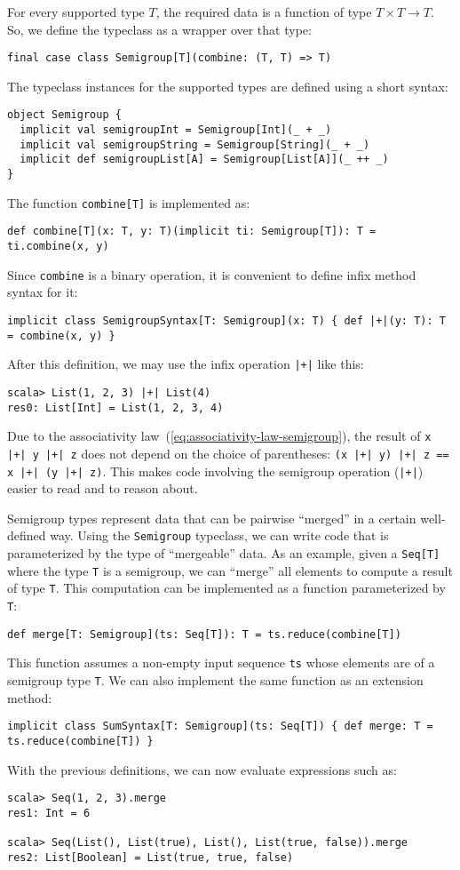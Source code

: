 For every supported type $T$, the required data is a function of
type $T\times T\rightarrow T$. So, we define the typeclass as a wrapper
over that type:
\begin{lstlisting}
final case class Semigroup[T](combine: (T, T) => T)
\end{lstlisting}
The typeclass instances for the supported types are defined using
a short syntax:
\begin{lstlisting}
object Semigroup {
  implicit val semigroupInt = Semigroup[Int](_ + _)
  implicit val semigroupString = Semigroup[String](_ + _)
  implicit def semigroupList[A] = Semigroup[List[A]](_ ++ _)
}
\end{lstlisting}
The function \lstinline!combine[T]! is implemented as:
\begin{lstlisting}
def combine[T](x: T, y: T)(implicit ti: Semigroup[T]): T = ti.combine(x, y)
\end{lstlisting}
Since \lstinline!combine! is a binary operation, it is convenient
to define infix method syntax for it:
\begin{lstlisting}
implicit class SemigroupSyntax[T: Semigroup](x: T) { def |+|(y: T): T = combine(x, y) }
\end{lstlisting}
After this definition, we may use the infix operation \lstinline!|+|!
like this:
\begin{lstlisting}
scala> List(1, 2, 3) |+| List(4)
res0: List[Int] = List(1, 2, 3, 4)
\end{lstlisting}
Due to the associativity law~(\ref{eq:associativity-law-semigroup}),
the result of \lstinline!x |+| y |+| z! does not depend on the choice
of parentheses: \lstinline!(x |+| y) |+| z == x |+| (y |+| z)!. This
makes code involving the semigroup operation (\lstinline!|+|!) easier
to read and to reason about.

Semigroup types represent data that can be pairwise \textsf{``}merged\textsf{''} in
a certain well-defined way. Using the \lstinline!Semigroup! typeclass,
we can write code that is parameterized by the type of \textsf{``}mergeable\textsf{''}
data. As an example, given a \lstinline!Seq[T]! where the type \lstinline!T!
is a semigroup, we can \textsf{``}merge\textsf{''} all elements to compute a result
of type \lstinline!T!. This computation can be implemented as a function
parameterized by \lstinline!T!:
\begin{lstlisting}
def merge[T: Semigroup](ts: Seq[T]): T = ts.reduce(combine[T])
\end{lstlisting}
This function assumes a non-empty input sequence \lstinline!ts! whose
elements are of a semigroup type \lstinline!T!. We can also implement
the same function as an extension method:
\begin{lstlisting}
implicit class SumSyntax[T: Semigroup](ts: Seq[T]) { def merge: T = ts.reduce(combine[T]) }
\end{lstlisting}
With the previous definitions, we can now evaluate expressions such
as:
\begin{lstlisting}
scala> Seq(1, 2, 3).merge
res1: Int = 6

scala> Seq(List(), List(true), List(), List(true, false)).merge
res2: List[Boolean] = List(true, true, false)
\end{lstlisting}

